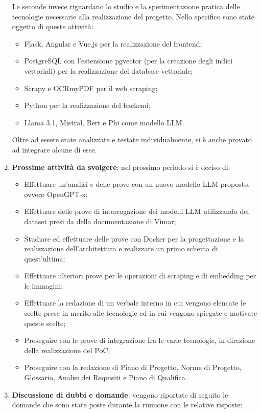 \begin{enumerate}
    Le seconde invece riguardano lo studio e la sperimentazione pratica delle tecnologie necessarie alla realizzazione del progetto. Nello specifico sono state oggetto di queste attività:
    \begin{itemize}
        \item Flask, Angular e Vue.js per la realizzazione del frontend;
        \item PostgreSQL con l'estensione pgvector (per la creazione degli indici vettoriali) per la realizzazione del database vettoriale;
        \item Scrapy e OCRmyPDF per il web scraping;
        \item Python per la realizzazione del backend;
        \item Llama 3.1, Mistral, Bert e Phi come modello LLM.
    \end{itemize}
    Oltre ad essere state analizzate e testate individualmente, si è anche provato ad integrare alcune di esse.
    \item \textbf{Prossime attività da svolgere}: nel prossimo periodo si è deciso di:
    \begin{itemize}
        \item Effettuare un'analisi e delle prove con un nuovo modello LLM proposto, ovvero OpenGPT-x;
        \item Effettuare delle prove di interrogazione dei modelli LLM utilizzando dei dataset presi da della documentazione di Vimar;
        \item Studiare ed effettuare delle prove con Docker per la progettazione e la realizzazione dell'architettura e realizzare un primo schema di quest'ultima;
        \item Effettuare ulteriori prove per le operazioni di scraping e di embedding per le immagini;
        \item Effettuare la redazione di un verbale interno in cui vengono elencate le scelte prese in merito alle tecnologie ed in cui vengono spiegate e motivate queste scelte;
        \item Proseguire con le prove di integrazione fra le varie tecnologie, in direzione della realizzazione del PoC;
        \item Proseguire con la redazione di Piano di Progetto, Norme di Progetto, Glossario, Analisi dei Requisiti e Piano di Qualifica.
    \end{itemize}
    \item \textbf{Discussione di dubbi e domande}: vengono riportate di seguito le domande che sono state poste durante la riunione con le relative risposte:

\end{enumerate}
